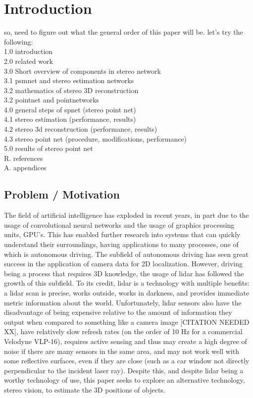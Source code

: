 \section{Introduction}
so, need to figure out what the general order of this paper will be. let's try the following: \\
1.0 introduction \\
2.0 related work \\
3.0 Short overview of components in stereo network \\
  3.1 psmnet and stereo estimation networks \\
  3.2 mathematics of stereo 3D reconstruction \\
  3.2 pointnet and pointnetworks \\
4.0 general steps of spnet (stereo point net) \\
  4.1 stereo estimation (performance, results) \\
  4.2 stereo 3d reconstruction (performance, results) \\
  4.3 stereo point net (procedure, modifications, performance) \\
5.0 results of stereo point net \\
R. references \\
A. appendices \\

\subsection{Problem / Motivation}
The field of artificial intelligence has exploded in recent years, in part due to the usage of convolutional neural networks and the usage of graphics processing units, GPU's. This has enabled further research into systems that can quickly understand their surroundings, having applications to many processes, one of which is autonomous driving. The subfield of autonomous driving has seen great success in the application of camera data for 2D localization. However, driving being a process that requires 3D knowledge, the usage of lidar has followed the growth of this subfield. To its credit, lidar is a technology with multiple benefits: a lidar scan is precise, works outside, works in darkness, and provides immediate metric information about the world. Unfortunately, lidar sensors also have the disadvantage of being expensive relative to the amount of information they output when compared to something like a camera image [CITATION NEEDED XX], have relatively slow refresh rates (on the order of 10 Hz for a commercial Velodyne VLP-16), requires active sensing and thus may create a high degree of noise if there are many sensors in the same area, and may not work well with some reflective surfaces, even if they are close (such as a car window not directly perpendicular to the incident laser ray). Despite this, and despite lidar being a worthy technology of use, this paper seeks to explore an alternative technology, stereo vision, to estimate the 3D positions of objects. 

